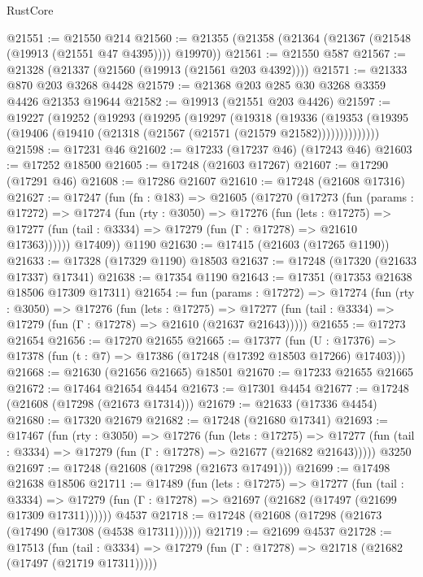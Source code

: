 \begin{lexlean}{RustCore}
\begin{coremodule}
@21551 := @21550 @214
@21560 := @21355 (@21358 (@21364 (@21367 (@21548 (@19913 (@21551 @47 @4395)))) @19970))
@21561 := @21550 @587
@21567 := @21328 (@21337 (@21560 (@19913 (@21561 @203 @4392))))
@21571 := @21333 @870 @203 @3268 @4428
@21579 := @21368 @203 @285 @30 @3268 @3359 @4426 @21353 @19644
@21582 := @19913 (@21551 @203 @4426)
@21597 := @19227
    (@19252
      (@19293
        (@19295
          (@19297
            (@19318
              (@19336
                (@19353 (@19395 (@19406 (@19410 (@21318 (@21567 (@21571 (@21579 @21582))))))))))))))
@21598 := @17231 @46
@21602 := @17233 (@17237 @46) (@17243 @46)
@21603 := @17252 @18500
@21605 := @17248 (@21603 @17267)
@21607 := @17290 (@17291 @46)
@21608 := @17286 @21607
@21610 := @17248 (@21608 @17316)
@21627 := @17247
    (fun (fn : @183) =>
    @21605
      (@17270
        (@17273
          (fun (params : @17272) =>
          @17274
            (fun (rty : @3050) =>
            @17276
              (fun (lets : @17275) =>
              @17277 (fun (tail : @3334) => @17279 (fun (Γ : @17278) => @21610 @17363))))))
        @17409))
    @1190
@21630 := @17415 (@21603 (@17265 @1190))
@21633 := @17328 (@17329 @1190) @18503
@21637 := @17248 (@17320 (@21633 @17337) @17341)
@21638 := @17354 @1190
@21643 := @17351 (@17353 @21638 @18506 @17309 @17311)
@21654 := fun (params : @17272) =>
  @17274
    (fun (rty : @3050) =>
    @17276
      (fun (lets : @17275) =>
      @17277 (fun (tail : @3334) => @17279 (fun (Γ : @17278) => @21610 (@21637 @21643)))))
@21655 := @17273 @21654
@21656 := @17270 @21655
@21665 := @17377
    (fun (U : @17376) => @17378 (fun (t : @7) => @17386 (@17248 (@17392 @18503 @17266) @17403)))
@21668 := @21630 (@21656 @21665) @18501
@21670 := @17233 @21655 @21665
@21672 := @17464 @21654 @4454
@21673 := @17301 @4454
@21677 := @17248 (@21608 (@17298 (@21673 @17314)))
@21679 := @21633 (@17336 @4454)
@21680 := @17320 @21679
@21682 := @17248 (@21680 @17341)
@21693 := @17467
    (fun (rty : @3050) =>
    @17276
      (fun (lets : @17275) =>
      @17277 (fun (tail : @3334) => @17279 (fun (Γ : @17278) => @21677 (@21682 @21643)))))
    @3250
@21697 := @17248 (@21608 (@17298 (@21673 @17491)))
@21699 := @17498 @21638 @18506
@21711 := @17489
    (fun (lets : @17275) =>
    @17277
      (fun (tail : @3334) =>
      @17279 (fun (Γ : @17278) => @21697 (@21682 (@17497 (@21699 @17309 @17311))))))
    @4537
@21718 := @17248 (@21608 (@17298 (@21673 (@17490 (@17308 (@4538 @17311))))))
@21719 := @21699 @4537
@21728 := @17513
    (fun (tail : @3334) => @17279 (fun (Γ : @17278) => @21718 (@21682 (@17497 (@21719 @17311)))))

\end{coremodule}
\end{lexlean}
